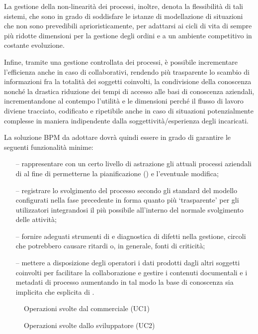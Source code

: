La gestione della non-linearità dei processi, inoltre, denota la flessibilità di tali sistemi, che sono in grado di soddisfare le istanze di modellazione di situazioni che non sono prevedibili aprioristicamente, per adattarsi ai cicli di vita di sempre più ridotte dimensioni per la gestione degli ordini e a un ambiente competitivo in costante evoluzione.

Infine, tramite una gestione controllata dei processi, è possibile incrementare l'efficienza anche in caso di  collaborativi, rendendo più trasparente lo scambio di informazioni fra la totalità dei soggetti coinvolti, la condivisione della conoscenza nonché la drastica riduzione dei tempi di accesso alle basi di conoscenza aziendali, incrementandone al contempo l'utilità e le dimensioni perché il flusso di lavoro diviene tracciato, codificato e ripetibile anche in caso di situazioni potenzialmente complesse in maniera indipendente dalla soggettività/esperienza degli incaricati.

La soluzione BPM da adottare dovrà quindi essere in grado di garantire le seguenti funzionalità minime:
\begin{itemize}
  \item[--] rappresentare con un certo livello di astrazione gli attuali processi aziendali di \customer al fine di permetterne la pianificazione (\bsn {}) e l'eventuale modifica;
  \item[--] registrare lo svolgimento del processo secondo gli standard del modello configurati nella fase precedente in forma quanto più `trasparente' per gli utilizzatori integrandosi il più possibile all'interno del normale svolgimento delle attività;
  \item[--] fornire adeguati strumenti di  e diagnostica di difetti nella gestione, circoli che potrebbero causare ritardi o, in generale, fonti di criticità;
  \item[--] mettere a disposizione degli operatori i dati prodotti dagli altri soggetti coinvolti per facilitare la collaborazione e gestire i contenuti documentali e i metadati di processo aumentando in tal modo la base di conoscenza sia implicita che esplicita di \customer.
\end{itemize}

\begin{figure}[H]
  \centering
  
  \caption{Operazioni svolte dal commerciale (UC1)}
\end{figure}

\begin{figure}[H]
  \centering
  
  \caption{Operazioni svolte dallo sviluppatore (UC2)}
\end{figure}




